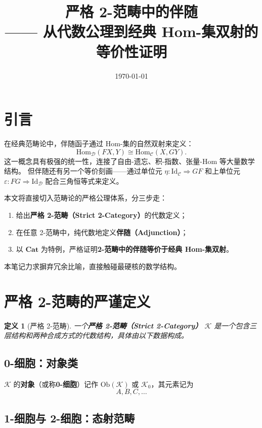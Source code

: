 \documentclass[12pt,a4paper]{ctexart}
\title{\bfseries 严格 2-范畴中的伴随\\[0.3cm] \large —— 从代数公理到经典 Hom-集双射的等价性证明}
\author{}
\date{\today}
\newtheorem{definition}{定义}[section]
\theoremstyle{definition}
\newcommand{\cat}[1]{\mathbf{#1}}
\newcommand{\Cat}{\cat{Cat}}
\newcommand{\Ob}{\mathrm{Ob}}
\newcommand{\Hom}{\mathrm{Hom}}
\newcommand{\Id}{\mathrm{Id}}
\begin{document}
\maketitle
\tableofcontents
\newpage

\section{引言}

在经典范畴论中，伴随函子通过 Hom-集的自然双射来定义：
\[
\Hom_{\mathcal{D}}(FX, Y) \cong \Hom_{\mathcal{C}}(X, GY).
\]
这一概念具有极强的统一性，连接了自由-遗忘、积-指数、张量-Hom 等大量数学结构。
但伴随还有另一个等价刻画——通过单位元 $\eta: \Id_{\mathcal{C}} \Rightarrow GF$ 和上单位元 $\varepsilon: FG \Rightarrow \Id_{\mathcal{D}}$ 配合三角恒等式来定义。

本文将直接切入范畴论的严格公理体系，分三步走：
\begin{enumerate}[leftmargin=*]
    \item 给出\textbf{严格 2-范畴（Strict 2-Category）}的代数定义；
    \item 在任意 2-范畴中，纯代数地定义\textbf{伴随（Adjunction）}；
    \item 以 $\Cat$ 为特例，严格证明\textbf{2-范畴中的伴随等价于经典 Hom-集双射}。
\end{enumerate}

本笔记力求摒弃冗余比喻，直接触碰最硬核的数学结构。

\section{严格 2-范畴的严谨定义}

\begin{definition}[严格 2-范畴]
一个\textbf{严格 2-范畴（Strict 2-Category）} $\mathcal{K}$ 是一个包含三层结构和两种合成方式的代数结构，具体由以下数据构成。
\end{definition}

\subsection{0-细胞：对象类}

$\mathcal{K}$ 的\textbf{对象}（或称\textbf{0-细胞}）记作 $\Ob(\mathcal{K})$ 或 $\mathcal{K}_0$，其元素记为
\[
A, B, C, \dots
\]

\subsection{1-细胞与 2-细胞：态射范畴}
\end{document}
